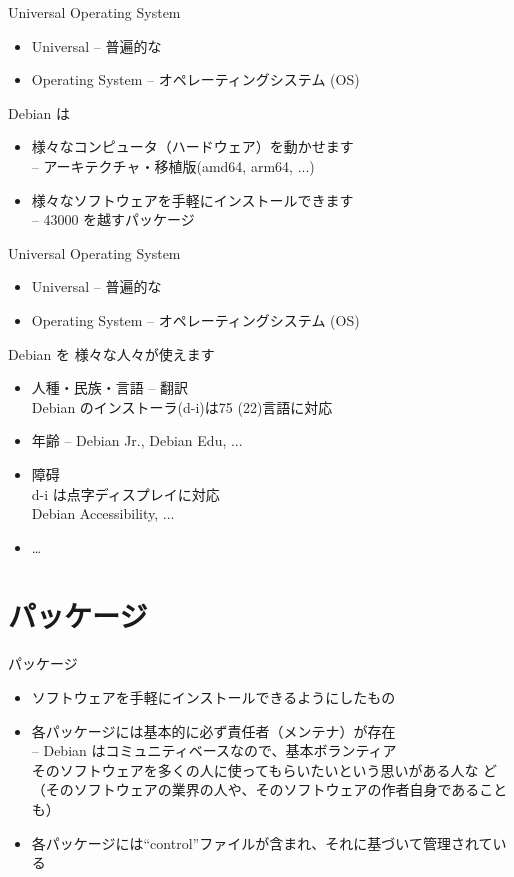 \begin{frame}{Universal Operating System}
\begin{itemize}
 \item Universal -- 普遍的な
 \item Operating System -- オペレーティングシステム (OS)
\end{itemize}\pause
 Debian は\pause
 \begin{itemize}
  \item 様々なコンピュータ（ハードウェア）を動かせます\\
	-- アーキテクチャ・移植版(amd64, arm64, ...)\pause
  \item 様々なソフトウェアを手軽にインストールできます\\
	-- 43000 を越すパッケージ
 \end{itemize}
\end{frame}

\begin{frame}{Universal Operating System}
\begin{itemize}
 \item Universal -- 普遍的な
 \item Operating System -- オペレーティングシステム (OS)
\end{itemize}\pause
 Debian を\pause
 様々な人々が使えます\pause
 \begin{itemize}
  \item 人種・民族・言語 -- 翻訳\\
	Debian のインストーラ(d-i)は75 (22)言語に対応
  \item 年齢 -- Debian Jr., Debian Edu, ...
  \item 障碍\\
	d-i は点字ディスプレイに対応\\
	Debian Accessibility, ...
  \item …
 \end{itemize}
\end{frame}

\section{パッケージ}

  \begin{frame}{パッケージ}
\begin{itemize}
 \item ソフトウェアを手軽にインストールできるようにしたもの\pause
 \item 各パッケージには基本的に必ず責任者（メンテナ）が存在\\
       -- Debian はコミュニティベースなので、基本ボランティア\\
       そのソフトウェアを多くの人に使ってもらいたいという思いがある人な
       ど（そのソフトウェアの業界の人や、そのソフトウェアの作者自身であることも）\pause
 \item 各パッケージには“control”ファイルが含まれ、それに基づいて管理されている
\end{itemize} 
  \end{frame}

